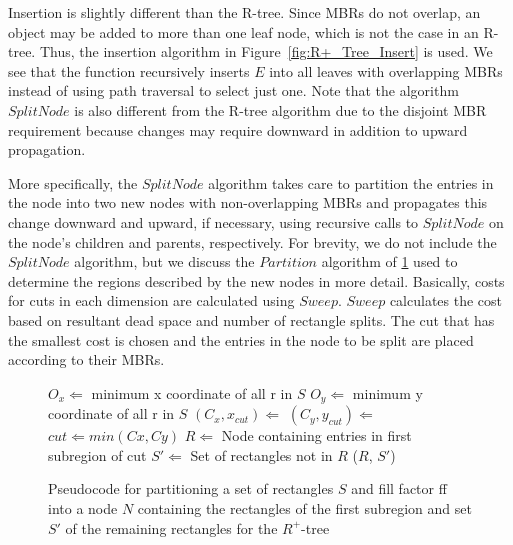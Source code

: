 Insertion is slightly different than the R-tree. Since MBRs do not overlap, an
object may be added to more than one leaf node, which is not the case in an R-tree. 
Thus, the insertion algorithm in Figure~\ref{fig:R+_Tree_Insert} is used. We see that
the function recursively inserts $E$ into all leaves with overlapping MBRs instead of 
using path traversal to select just one. Note that the algorithm $SplitNode$ is 
also different from the R-tree algorithm due to the disjoint MBR requirement because
changes may require downward in addition to upward propagation. 

More specifically, the $SplitNode$ algorithm takes care to partition the entries in 
the node into two new nodes with non-overlapping MBRs and propagates this change 
downward and upward, if necessary, using recursive calls to $SplitNode$ on the node's
children and parents, respectively. For brevity, we do not include the $SplitNode$ 
algorithm, but we discuss the $Partition$ algorithm of \ref{fig:R+_Tree_Partition} 
used to determine the regions described by the new nodes in more detail. Basically, 
costs for cuts in each dimension are calculated using $Sweep$. $Sweep$ calculates the
cost based on resultant dead space and number of rectangle splits. The cut that has 
the smallest cost is chosen and the entries in the node to be split are placed 
according to their MBRs. 


\begin{figure}[t!]
\begin{algorithmic}
		\EndIf
		\State $O_{x} \Leftarrow$ minimum x coordinate of all r in $S$
		\State $O_{y} \Leftarrow$ minimum y coordinate of all r in $S$
		\State $(C_{x}, x_{cut}) \Leftarrow$ 
		\State $(C_{y}, y_{cut}) \Leftarrow$ 
		\State $cut \Leftarrow min(Cx, Cy)$
		\State $R \Leftarrow$ Node containing entries in first subregion of cut
		\State $S' \Leftarrow$ Set of rectangles not in $R$ 
		\Return ($R$, $S'$)
	\EndFunction
\end{algorithmic}
\caption{Pseudocode for partitioning a set of rectangles $S$ and fill factor ff into
	a node $N$ containing the rectangles of the first subregion and set $S'$ of
	the remaining rectangles for the $R^{+}$-tree}
\label{fig:R+_Tree_Partition}
\end{figure}


